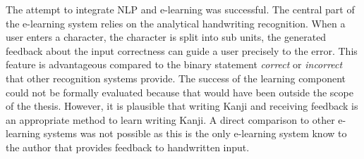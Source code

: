 The attempt to integrate NLP and e-learning was successful. The central part of
the e-learning system relies on the analytical handwriting recognition. 
When a user enters a character, the character is split into sub units, 
the generated feedback about the input correctness can guide a user precisely 
to the error. This feature is advantageous compared to the binary statement 
\emph{correct} or \emph{incorrect} that other recognition systems provide.
The success of the learning component could not be formally evaluated 
because that would have been outside the scope of the thesis. 
However, it is plausible that writing
Kanji and receiving feedback is an appropriate method to learn writing
Kanji. A direct comparison to other e-learning systems was not possible as this
is the only e-learning system know to the author that provides feedback to
handwritten input. 

